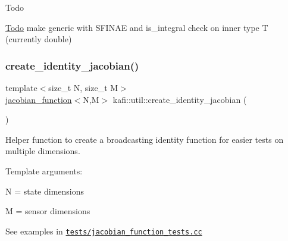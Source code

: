 \begin{DoxyRefDesc}{Todo}
\item[\hyperlink{todo__todo000006}{Todo}]make generic with S\+F\+I\+N\+AE and {\ttfamily is\+\_\+integral} check on inner type {\ttfamily T} (currently {\ttfamily double}) \end{DoxyRefDesc}
\mbox{\label{namespacekafi_1_1util_a82e8f22857719d09437ce64e90c4b457}} 
\subsubsection{\texorpdfstring{create\+\_\+identity\+\_\+jacobian()}{create\_identity\_jacobian()}}
{\footnotesize\ttfamily template$<$size\+\_\+t N, size\+\_\+t M$>$ \\
\hyperlink{classkafi_1_1jacobian__function}{jacobian\+\_\+function}$<$N,M$>$ kafi\+::util\+::create\+\_\+identity\+\_\+jacobian (\begin{DoxyParamCaption}{ }\end{DoxyParamCaption})}



Helper function to create a broadcasting identity function for easier tests on multiple dimensions. 

Template arguments\+:
\begin{DoxyItemize}
\item {\ttfamily N} = state dimensions
\item {\ttfamily M} = sensor dimensions
\end{DoxyItemize}

See examples in \href{../../tests/jacobian_function_tests.cc}{\tt tests/jacobian\+\_\+function\+\_\+tests.\+cc}

